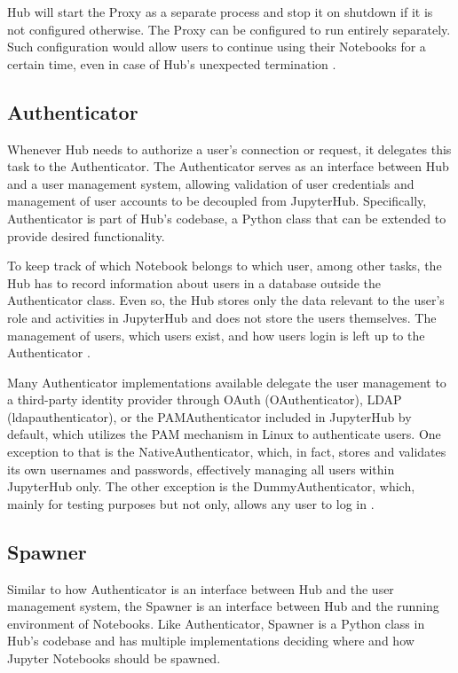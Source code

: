\documentclass[
  digital,     %
  oneside,     %
  nosansbold,  %
  nocolorbold, %
  lof,         %
  nolot,         %
]{fithesis4}
\begin{document}
Hub will start the Proxy as a separate process and stop it on shutdown if it is not configured otherwise. The Proxy can be configured to run entirely separately. Such configuration would allow users to continue using their Notebooks for a certain time, even in case of Hub's unexpected termination \cite{jupyterhub_arch}.

\subsection{Authenticator}
\label{subsec:jupyterhub:authenticator}

Whenever Hub needs to authorize a user's connection or request, it delegates this task to the Authenticator. The Authenticator serves as an interface between Hub and a user management system, allowing validation of user credentials and management of user accounts to be decoupled from JupyterHub. Specifically, Authenticator is part of Hub's codebase, a Python class that can be extended to provide desired functionality.

To keep track of which Notebook belongs to which user, among other tasks, the Hub has to record information about users in a database outside the Authenticator class. Even so, the Hub stores only the data relevant to the user's role and activities in JupyterHub and does not store the users themselves. The management of users, which users exist, and how users login is left up to the Authenticator \cite{jupyterhub_arch}.

Many Authenticator implementations available delegate the user management to a third-party identity provider through OAuth (OAuthenticator), LDAP (ldapauthenticator), or the PAMAuthenticator included in JupyterHub by default, which utilizes the PAM mechanism in Linux to authenticate users. One exception to that is the NativeAuthenticator, which, in fact, stores and validates its own usernames and passwords, effectively managing all users within JupyterHub only. The other exception is the DummyAuthenticator, which, mainly for testing purposes but not only, allows any user to log in \cite{jupyterhub_arch}.

\subsection{Spawner}
\label{sec:spawner}
Similar to how Authenticator is an interface between Hub and the user management system, the Spawner is an interface between Hub and the running environment of Notebooks. Like Authenticator, Spawner is a Python class in Hub's codebase and has multiple implementations deciding where and how Jupyter Notebooks should be spawned. 
\end{document}
